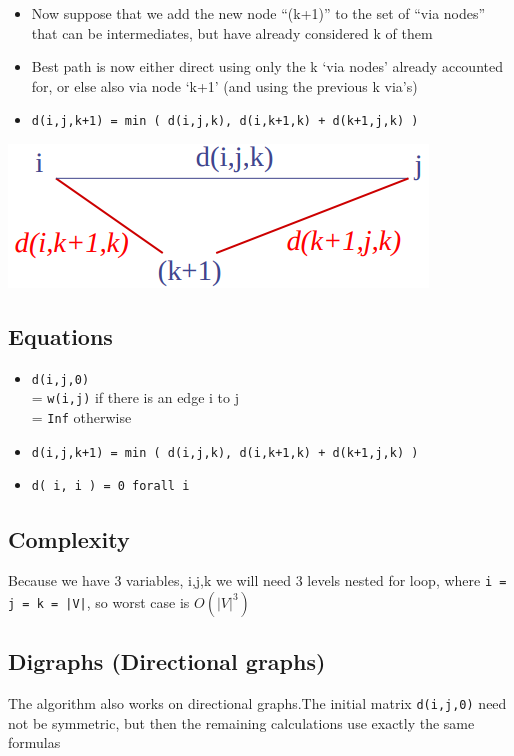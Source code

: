 \documentclass{article}
\begin{document}
\begin{itemize}
	\item Now suppose that we add the new node “(k+1)” to the set of “via nodes” that can be intermediates, but have already considered k of them
	\item Best path is now either direct using only the k ‘via nodes’ already accounted for, or else also via node ‘k+1’ (and using the previous k via’s)
	\item \texttt{d(i,j,k+1) = min ( d(i,j,k), d(i,k+1,k) + d(k+1,j,k) )}
\end{itemize}
\begin{center}
	\includegraphics[scale=0.5]{k+1_shortest.png}
\end{center}

\subsection{Equations}
\begin{itemize}
	\item \texttt{d(i,j,0)} \\
		= \texttt{w(i,j)} if there is an edge i to j \\
		= \texttt{Inf} otherwise
	\item \texttt{d(i,j,k+1) = min ( d(i,j,k), d(i,k+1,k) + d(k+1,j,k) )}
	\item \texttt{d( i, i ) = 0 forall i}
\end{itemize}

\subsection{Complexity}
\begin{flushleft}
Because we have 3 variables, i,j,k we will need 3 levels nested for loop, where \texttt{i = j = k = |V|}, so worst case is $O(|V|^3)$
\end{flushleft}

\subsection{Digraphs (Directional graphs)}
\begin{flushleft}
The algorithm also works on directional graphs.The initial matrix \texttt{d(i,j,0)} need not be symmetric, but then
the remaining calculations use exactly the same formulas
\end{flushleft}
\end{document}
